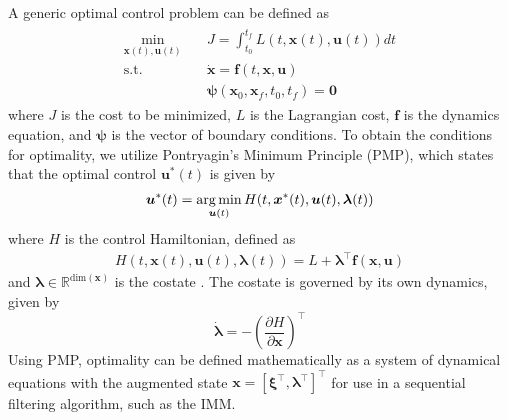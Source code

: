 A generic optimal control problem can be defined as
\begin{align}
\begin{split}
     \min_{\bm{x}(t), \bm{u}(t)} & \quad J = \int_{t_0}^{t_f} L(t, \bm{x}(t), \bm{u}(t)) dt \\
     \text{s.t.} & \quad  \dot{\bm{x}} = \bm{f}(t, \bm{x}, \bm{u}) \\
     & \quad \bm{\psi}(\bm{x}_0, \bm{x}_f, t_0, t_f) = \bm{0}
\end{split}
\end{align}
\noindent where $J$ is the cost to be minimized, $L$ is the Lagrangian cost, $\bm{f}$ is the dynamics equation, and $\bm{\psi}$ is the vector of boundary conditions. To obtain the conditions for optimality, we utilize Pontryagin's Minimum Principle (PMP), which states that the optimal control $\bm{u}^*(t)$ is given by
\begin{align}
    \bm{u}^*(t) = \operatorname*{arg\,min}_{\bm{u}(t)} H(t, \bm{x}^*(t), \bm{u}(t), \bm{\lambda}(t)) \label{PMP optimal control}
\end{align}
\noindent where $H$ is the control Hamiltonian, defined as
\begin{align}
    H(t, \bm{x}(t), \bm{u}(t), \bm{\lambda}(t)) = L + \bm{\lambda}^\top \bm{f}(\bm{x}, \bm{u}) \label{PMP Hamiltonian}
\end{align}
\noindent and $\bm{\lambda} \in \mathbb{R}^{\text{dim}(\bm{x})}$ is the costate \cite{pontryagin1962}. The costate is governed by its own dynamics, given by
\begin{equation}
    \dot{\bm{\lambda}} = -\left(\frac{\partial H}{\partial\bm{x}} \right)^\top \label{PMP costate dynamics}
\end{equation}
Using PMP, optimality can be defined mathematically as a system of dynamical equations with the augmented state $\bm{x} = [\bm{\xi}^\top, \bm{\lambda}^\top]^\top$ for use in a sequential filtering algorithm, such as the IMM.
